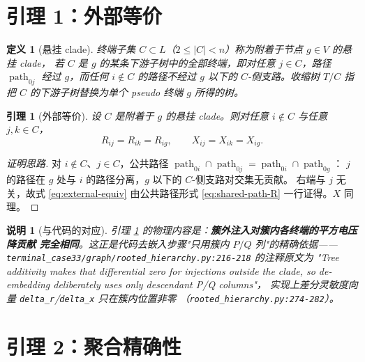 \documentclass[UTF8,11pt]{ctexart}
\newtheorem{definition}{定义}
\newtheorem{lemma}{引理}
\newtheorem{remark}{说明}
\begin{document}
\section{引理 1：外部等价}
\label{sec:external-equivalence}

\begin{definition}[悬挂 clade]
终端子集 $C\subset L$（$2\le |C|<n$）称为附着于节点 $g\in V$ 的\emph{悬挂 clade}，
若 $C$ 是 $g$ 的某条下游子树中的全部终端，即对任意 $j\in C$，路径
$\operatorname{path}_{0j}$ 经过 $g$，而任何 $i\notin C$ 的路径不经过 $g$ 以下的
$C$-侧支路。收缩树 $T/C$ 指把 $C$ 的下游子树替换为单个 pseudo 终端 $g$ 所得的树。
\end{definition}

\begin{lemma}[外部等价]
\label{lem:external}
设 $C$ 是附着于 $g$ 的悬挂 clade。则对任意 $i\notin C$ 与任意 $j,k\in C$，
\begin{equation}
  R_{ij}=R_{ik}=R_{ig},
  \qquad
  X_{ij}=X_{ik}=X_{ig}.
  \label{eq:external-equiv}
\end{equation}
\end{lemma}

\begin{proof}[证明思路]
对 $i\notin C$、$j\in C$，公共路径
$\operatorname{path}_{0i}\cap\operatorname{path}_{0j}
=\operatorname{path}_{0i}\cap\operatorname{path}_{0g}$：
$j$ 的路径在 $g$ 处与 $i$ 的路径分离，$g$ 以下的 $C$-侧支路对交集无贡献。
右端与 $j$ 无关，故式 \eqref{eq:external-equiv} 由公共路径形式
\eqref{eq:shared-path-R} 一行证得。$X$ 同理。
\end{proof}

\begin{remark}[与代码的对应]
引理 \ref{lem:external} 的物理内容是：\textbf{簇外注入对簇内各终端的平方电压降贡献
完全相同}。这正是代码去嵌入步骤"只用簇内 $P/Q$ 列"的精确依据——
\texttt{terminal\_case33/graph/rooted\_hierarchy.py:216-218} 的注释原文为
"Tree additivity makes that differential zero for injections outside the clade,
so de-embedding deliberately uses only descendant P/Q columns"，
实现上差分灵敏度向量 \texttt{delta\_r}/\texttt{delta\_x} 只在簇内位置非零
（\texttt{rooted\_hierarchy.py:274-282}）。
\end{remark}

\section{引理 2：聚合精确性}
\label{sec:aggregation-exact}
\end{document}
